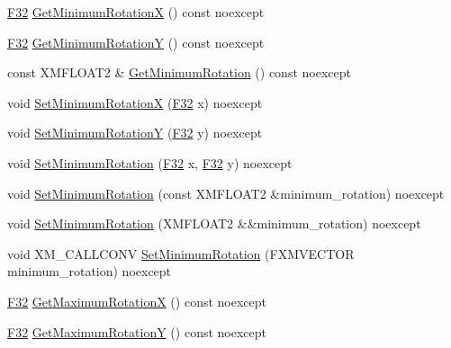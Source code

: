 \begin{DoxyCompactItemize}
\item 
\hyperlink{namespacemage_aa97e833b45f06d60a0a9c4fc22ae02c0}{F32} \hyperlink{classmage_1_1script_1_1_mouse_look_script_ae594a42302f9ccd47e08070759c3ccf7}{Get\+Minimum\+RotationX} () const noexcept
\item 
\hyperlink{namespacemage_aa97e833b45f06d60a0a9c4fc22ae02c0}{F32} \hyperlink{classmage_1_1script_1_1_mouse_look_script_a8faf82867207fb604f7155b8dbadfdb0}{Get\+Minimum\+RotationY} () const noexcept
\item 
const X\+M\+F\+L\+O\+A\+T2 \& \hyperlink{classmage_1_1script_1_1_mouse_look_script_a0e2fb755d8972814f6823a6d5e4507f4}{Get\+Minimum\+Rotation} () const noexcept
\item 
void \hyperlink{classmage_1_1script_1_1_mouse_look_script_a07c261e34b3131114efacb0d0f6ae076}{Set\+Minimum\+RotationX} (\hyperlink{namespacemage_aa97e833b45f06d60a0a9c4fc22ae02c0}{F32} x) noexcept
\item 
void \hyperlink{classmage_1_1script_1_1_mouse_look_script_ab78678ccb7bdf6ac4093b7911bf81d54}{Set\+Minimum\+RotationY} (\hyperlink{namespacemage_aa97e833b45f06d60a0a9c4fc22ae02c0}{F32} y) noexcept
\item 
void \hyperlink{classmage_1_1script_1_1_mouse_look_script_a6964af9c1c264be02c37671019ab117f}{Set\+Minimum\+Rotation} (\hyperlink{namespacemage_aa97e833b45f06d60a0a9c4fc22ae02c0}{F32} x, \hyperlink{namespacemage_aa97e833b45f06d60a0a9c4fc22ae02c0}{F32} y) noexcept
\item 
void \hyperlink{classmage_1_1script_1_1_mouse_look_script_a8d09e8b8f05b3aaf7973e5ce4ff22a82}{Set\+Minimum\+Rotation} (const X\+M\+F\+L\+O\+A\+T2 \&minimum\+\_\+rotation) noexcept
\item 
void \hyperlink{classmage_1_1script_1_1_mouse_look_script_a8748be9ee6bc6b0606c678a1d48ae190}{Set\+Minimum\+Rotation} (X\+M\+F\+L\+O\+A\+T2 \&\&minimum\+\_\+rotation) noexcept
\item 
void X\+M\+\_\+\+C\+A\+L\+L\+C\+O\+NV \hyperlink{classmage_1_1script_1_1_mouse_look_script_ab120a7b0d01acb64ae4287d716d89a09}{Set\+Minimum\+Rotation} (F\+X\+M\+V\+E\+C\+T\+OR minimum\+\_\+rotation) noexcept
\item 
\hyperlink{namespacemage_aa97e833b45f06d60a0a9c4fc22ae02c0}{F32} \hyperlink{classmage_1_1script_1_1_mouse_look_script_a5d0e63ee050bf07f5c8ad75ca9ced307}{Get\+Maximum\+RotationX} () const noexcept
\item 
\hyperlink{namespacemage_aa97e833b45f06d60a0a9c4fc22ae02c0}{F32} \hyperlink{classmage_1_1script_1_1_mouse_look_script_a24f48ac9e66f9c14645db71fd55ab9c6}{Get\+Maximum\+RotationY} () const noexcept

\end{DoxyCompactItemize}
